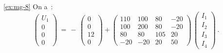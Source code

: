 \begin{solexercise}{\ref{ex:mg-8}}
On a~:
\[ \left( \begin{array}{c} U_1 \\\hline
0 \\ 0 \\ 0 \end{array} \right)
\: = \, -\, 
\left( \begin{array}{c} 0 \\\hline
0 \\ 12 \\ 0 \end{array} \right)
+ \left( \begin{array}{r|rrr} 
110 & 100 & 80 & -20 \\\hline
100 & 200 & 80 & -20\\
80 & 80 & 105 & 20\\
-20 & -20 & 20 & 50
\end{array} \right) \, 
\left(  \begin{array}{c} I_1 \\ I_2 \\ I_3 \\ I_4 \end{array} \right)~.  \]


\end{solexercise}
